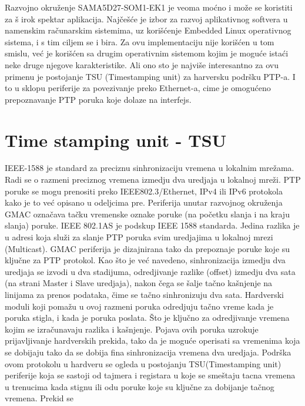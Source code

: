 \documentclass[a4paper,12pt, master]{etf}
\begin{document}
	Razvojno okru\v{z}enje SAMA5D27-SOM1-EK1 je veoma mo\'{c}no i mo\v{z}e se koristiti za \v{s}
	irok spektar aplikacija. Naj\v{c}e\v{s}\'{c}e je izbor za razvoj aplikativnog softvera u
	namenskim ra\v{c}unarskim sistemima, uz kori\v{s}\'{c}enje Embedded Linux operativnog
	sistema, i s tim ciljem se i bira. Za ovu implementaciju nije kori\v{s}\'{c}en u tom smislu,
	ve\'{c} je kori\v{s}\'{c}en sa drugim operativnim sistemom kojim je mogu\'{c}e ista\'{c}i
	neke druge njegove karakteristike. Ali ono sto je najvi\v{s}e interesantno za ovu primenu je
	postojanje TSU (Timestamping unit) za harversku podr\v{s}ku PTP-a. I to u sklopu periferije
	za povezivanje preko Ethernet-a, cime je omogu\'{c}eno prepoznavanje PTP poruka koje dolaze
	na interfejs.

	\section{Time stamping unit - TSU}
	IEEE-1588 je standard za preciznu sinhronizaciju vremena u lokalnim mre\v{z}ama. Radi se o
	razmeni	preciznog vremena izmedju dva uredjaja u lokalnoj mre\v{z}i. PTP poruke se mogu
	prenositi preko	IEEE802.3/Ethernet, IPv4 ili IPv6 protokola kako je to ve\'{c} opisano u
	odeljcima pre. Periferija unutar razvojnog okru\v{z}enja GMAC ozna\v{c}ava ta\v{c}ku
	vremenske oznake poruke (na po\v{c}etku slanja i na kraju slanja) poruke. IEEE 802.1AS je
	podskup IEEE 1588 standarda. Jedina razlika je u adresi koja slu\v{z}i za slanje PTP poruka
	svim uredjajima u lokalnoj mrezi (Multicast). GMAC periferija je dizajnirana tako da
	prepoznaje poruke koje su klju\v{c}ne za PTP protokol. Kao \v{s}to je ve\'{c} navedeno,
	sinhronizacija izmedju dva uredjaja se izvodi u dva stadijuma, odredjivanje razlike	(offset)
	izmedju dva sata (na strani Master i Slave uredjaja), nakon \v{c}ega se \v{s}alje ta\v{c}no
	ka\v{s}njenje na linijama za prenos podataka, \v{c}ime se ta\v{c}no sinhronizuju dva sata.
	Hardverski moduli koji poma\v{z}u u ovoj razmeni poruka odredjuju ta\v{c}no vreme kada je
	poruka stigla, i kada je poruka poslata. \v{S}to je klju\v{c}no za odredjivanje vremena
	kojim se izra\v{c}unavaju razlika i ka\v{s}njenje. Pojava ovih poruka uzrokuje
	prijavljivanje hardverskih prekida, tako da je mogu\'{c}e operisati sa vremenima koja se
	dobijaju tako da se dobija fina sinhronizacija vremena dva uredjaja. Podr\v{s}ka ovom
	protokolu u hardveru se ogleda u postojanju TSU(Timestamping unit) periferije
	koja se sastoji od tajmera i registara u koje se sme\v{s}taju tacna vremena u trenucima kada
	stignu ili odu poruke koje su klju\v{c}ne za dobijanje ta\v{c}nog vremena. Prekid se
\end{document}
